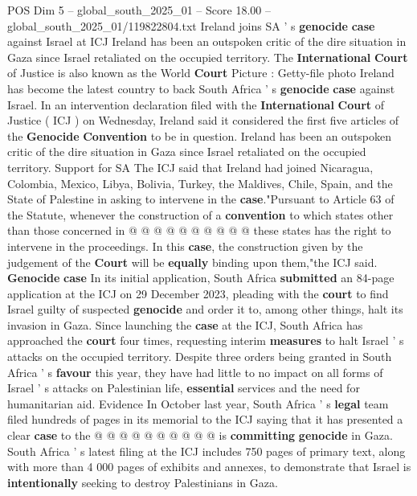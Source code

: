 \begin{textsample}{POS Dim 5 – global\_south\_2025\_01 – Score 18.00 – global\_south\_2025\_01/119822804.txt}  \label{ex:f5_pos_293}
Ireland joins SA ' s \textbf{genocide} \textbf{case} against Israel at ICJ Ireland has been an outspoken critic of the dire situation in Gaza since Israel retaliated on the occupied territory.
The \textbf{International} \textbf{Court} of Justice is also known as the World \textbf{Court} Picture : Getty-file photo Ireland has become the latest country to back South Africa ' s \textbf{genocide} \textbf{case} against Israel.
In an intervention declaration filed with the \textbf{International} \textbf{Court} of Justice ( ICJ ) on Wednesday, Ireland said it considered the first five articles of the \textbf{Genocide} \textbf{Convention} to be in question.
Ireland has been an outspoken critic of the dire situation in Gaza since Israel retaliated on the occupied territory.
Support for SA The ICJ said that Ireland had joined Nicaragua, Colombia, Mexico, Libya, Bolivia, Turkey, the Maldives, Chile, Spain, and the State of Palestine in asking to intervene in the \textbf{case}."Pursuant to Article 63 of the Statute, whenever the construction of a \textbf{convention} to which states other than those concerned in @ @ @ @ @ @ @ @ @ @ these states has the right to intervene in the proceedings.
In this \textbf{case}, the construction given by the judgement of the \textbf{Court} will be \textbf{equally} binding upon them,"the ICJ said. \textbf{Genocide} \textbf{case} In its initial application, South Africa \textbf{submitted} an 84-page application at the ICJ on 29 December 2023, pleading with the \textbf{court} to find Israel guilty of suspected \textbf{genocide} and order it to, among other things, halt its invasion in Gaza.
Since launching the \textbf{case} at the ICJ, South Africa has approached the \textbf{court} four times, requesting interim \textbf{measures} to halt Israel ' s attacks on the occupied territory.
Despite three orders being granted in South Africa ' s \textbf{favour} this year, they have had little to no impact on all forms of Israel ' s attacks on Palestinian life, \textbf{essential} services and the need for humanitarian aid.
Evidence In October last year, South Africa ' s \textbf{legal} team filed hundreds of pages in its memorial to the ICJ saying that it has presented a clear \textbf{case} to the @ @ @ @ @ @ @ @ @ @ is \textbf{committing} \textbf{genocide} in Gaza.
South Africa ' s latest filing at the ICJ includes 750 pages of primary text, along with more than 4 000 pages of exhibits and annexes, to demonstrate that Israel is \textbf{intentionally} seeking to destroy Palestinians in Gaza.

\end{textsample}
